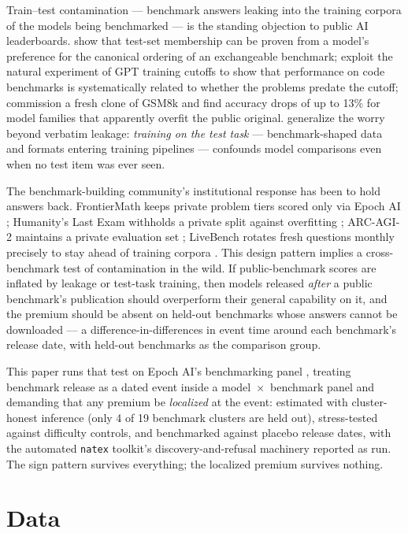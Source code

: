 \documentclass[11pt]{article}
\newcommand{\natex}{\texttt{natex}}
\begin{document}
Train--test contamination --- benchmark answers leaking into the training
corpora of the models being benchmarked --- is the standing objection to
public AI leaderboards. \cite{oren2023} show that test-set membership can be
proven from a model's preference for the canonical ordering of an
exchangeable benchmark; \cite{roberts2023} exploit the natural experiment of
GPT training cutoffs to show that performance on code benchmarks is
systematically related to whether the problems predate the cutoff;
\cite{zhang2024} commission a fresh clone of GSM8k and find accuracy drops of
up to 13\% for model families that apparently overfit the public original.
\cite{dominguez2024} generalize the worry beyond verbatim leakage:
\emph{training on the test task} --- benchmark-shaped data and formats
entering training pipelines --- confounds model comparisons even when no
test item was ever seen.

The benchmark-building community's institutional response has been to hold
answers back. FrontierMath keeps private problem tiers scored only via Epoch
AI \cite{glazer2024}; Humanity's Last Exam withholds a private split against
overfitting \cite{phan2025}; ARC-AGI-2 maintains a private evaluation set
\cite{chollet2025}; LiveBench rotates fresh questions monthly precisely to
stay ahead of training corpora \cite{white2024}. This design pattern implies
a cross-benchmark test of contamination in the wild. If public-benchmark
scores are inflated by leakage or test-task training, then models released
\emph{after} a public benchmark's publication should overperform their
general capability on it, and the premium should be absent on held-out
benchmarks whose answers cannot be downloaded --- a
difference-in-differences in event time around each benchmark's release
date, with held-out benchmarks as the comparison group.

This paper runs that test on Epoch AI's benchmarking panel
\cite{epochai,ho2025}, treating benchmark release as a dated event inside a
model~$\times$~benchmark panel and demanding that any premium be
\emph{localized} at the event: estimated with cluster-honest inference (only
4 of 19 benchmark clusters are held out), stress-tested against difficulty
controls, and benchmarked against placebo release dates, with the automated
\natex{} toolkit's discovery-and-refusal machinery \cite{natex} reported as
run. The sign pattern survives everything; the localized premium survives
nothing.

\section{Data}\label{sec:data}
\end{document}
